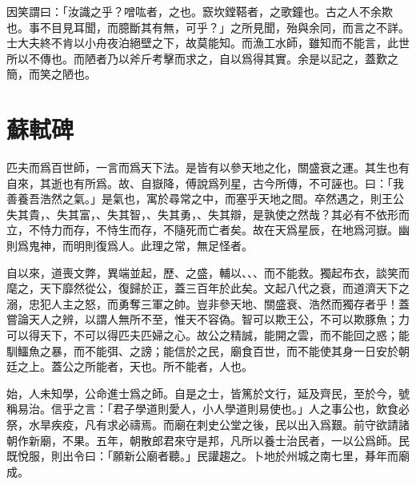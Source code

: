 因笑謂曰：「汝識之乎？噌吰者，之也。窾坎鏜鞳者，之歌鐘也。古之人不余欺也。事不目見耳聞，而臆斷其有無，可乎？」之所見聞，殆與余同，而言之不詳。士大夫終不肯以小舟夜泊絕壁之下，故莫能知。而漁工水師，雖知而不能言，此世所以不傳也。而陋者乃以斧斤考擊而求之，自以爲得其實。余是以記之，蓋歎之簡，而笑之陋也。

\section[潮州韓文公廟碑\quad{\small 蘇軾}]{{\normalsize 蘇軾}\quad {}碑}
匹夫而爲百世師，一言而爲天下法。是皆有以參天地之化，關盛衰之運。其生也有自來，其逝也有所爲。故、自嶽降，傅說爲列星，古今所傳，不可誣也。曰：「我善養吾浩然之氣。」是氣也，寓於尋常之中，而塞乎天地之間。卒然遇之，則王公失其貴，、失其富，、失其智，、失其勇，、失其{辯}，是孰使之然哉？其必有不依形而立，不恃力而存，不恃生而存，不隨死而亡者矣。故在天爲星辰，在地爲河嶽。幽則爲鬼神，而明則復爲人。此理之常，無足怪者。%

自以來，道喪文弊，異端並起，歷、之盛，輔以、、、而不能救。獨起布衣，談笑而麾之，天下靡然從公，復歸於正，蓋三百年於此矣。文起八代之衰，而道濟天下之溺，忠犯人主之怒，而勇奪三軍之帥。豈非參天地、關盛衰、浩然而獨存者乎！蓋嘗論天人之辨，以謂人無所不至，惟天不容偽。智可以欺王公，不可以欺豚魚；力可以得天下，不可以得匹夫匹婦之心。故公之精誠，能開之雲，而不能回之惑；能馴鱷魚之暴，而不能弭、之謗；能信於之民，廟食百世，而不能使其身一日安於朝廷之上。蓋公之所能者，天也。所不能者，人也。

始，人未知學，公命進士爲之師。自是之士，皆篤於文行，延及齊民，至於今，號稱易治。信乎之言：「君子學道則愛人，小人學道則易使也。」人之事公也，飲食必祭，水旱疾疫，凡有求必禱焉。而廟在刺史公堂之後，民以出入爲艱。前守欲請諸朝作新廟，不果。五年，朝散郎君來守是邦，凡所以養士治民者，一以公爲師。民既悅服，則出令曰：「願新公廟者聽。」民{讙}趨之。卜地於州城之南七里，朞年而廟成。%

